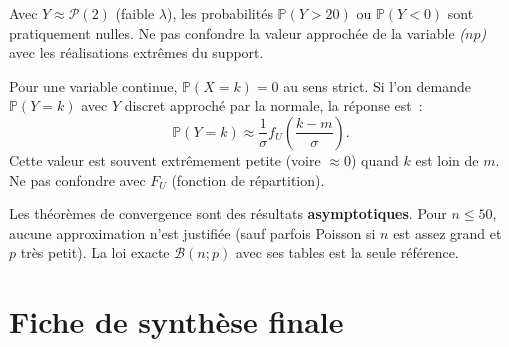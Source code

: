 \documentclass[11pt,a4paper]{article}
\renewcommand{\P}{\mathbb{P}}
\begin{document}
\begin{alertbox}
Avec $Y \approx \mathcal{P}(2)$ (faible $\lambda$), les probabilit\'es $\P(Y>20)$ ou $\P(Y<0)$ sont pratiquement nulles. Ne pas confondre la valeur approch\'ee de la variable \textit{($np$)} avec les r\'ealisations extr\^emes du support.
\end{alertbox}

\begin{alertbox}[Pi\`ege 6 -- Probabilit\'e ponctuelle $\P(X=k)$ via la loi normale]
Pour une variable continue, $\P(X=k)=0$ au sens strict. Si l'on demande $\P(Y=k)$ avec $Y$ discret approch\'e par la normale, la r\'eponse est~:
$$\P(Y=k) \approx \frac{1}{\sigma}f_U\!\left(\frac{k-m}{\sigma}\right).$$
Cette valeur est souvent extr\^emement petite (voire $\approx 0$) quand $k$ est loin de $m$. Ne pas confondre avec $F_U$ (fonction de r\'epartition).
\end{alertbox}

\begin{alertbox}
Les th\'eor\`emes de convergence sont des r\'esultats \textbf{asymptotiques}. Pour $n \leq 50$, aucune approximation n'est justifi\'ee (sauf parfois Poisson si $n$ est assez grand et $p$ tr\`es petit). La loi exacte $\mathcal{B}(n;p)$ avec ses tables est la seule r\'ef\'erence.
\end{alertbox}

\newpage
\section*{Fiche de synth\`ese finale}
\end{document}
